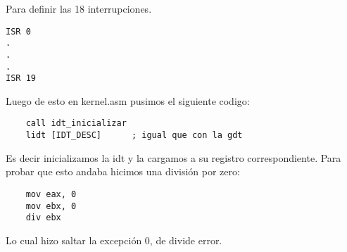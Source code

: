 \noindent Para definir las 18 interrupciones.

\begin{codesnippet}
\begin{verbatim}
ISR 0
.
.
.
ISR 19
\end{verbatim}
\end{codesnippet}


\noindent Luego de esto en kernel.asm pusimos el siguiente codigo:

\begin{codesnippet}
\begin{verbatim}
    call idt_inicializar
    lidt [IDT_DESC]      ; igual que con la gdt
\end{verbatim}
\end{codesnippet}

\noindent Es decir inicializamos la idt y la cargamos a su registro correspondiente. Para probar que esto andaba hicimos una división por zero:

\begin{codesnippet}
\begin{verbatim}
    mov eax, 0
    mov ebx, 0
    div ebx
\end{verbatim}
\end{codesnippet}

\noindent Lo cual hizo saltar la excepción 0, de divide error.